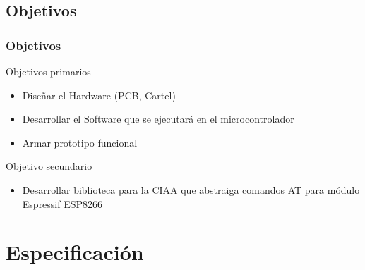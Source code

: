 \subsection{Objetivos}
\begin{frame}
	\frametitle{Objetivos}
	\begin{block}{Objetivos primarios}
		\begin{itemize}
			\item Diseñar el Hardware (PCB, Cartel)
			\item Desarrollar el Software que se ejecutará en el microcontrolador
			\item Armar prototipo funcional
		\end{itemize}
	\end{block}
	
	\begin{block}{Objetivo secundario}
		\begin{itemize}
			\item Desarrollar biblioteca para la CIAA que abstraiga comandos AT para módulo Espressif ESP8266
		\end{itemize}
	\end{block}
\end{frame}

\section{Especificación}


